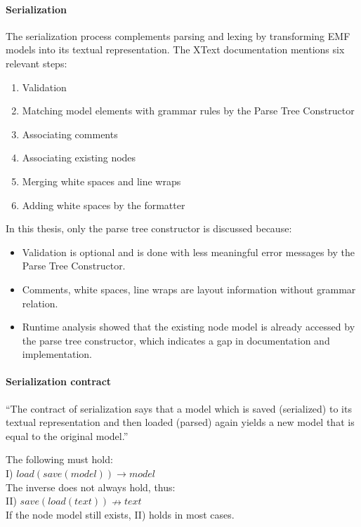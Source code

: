 \paragraph{Serialization}
The serialization process complements parsing and lexing by transforming EMF models into its textual representation. The XText documentation mentions six relevant steps:

\begin{enumerate}
	\item Validation
	\item Matching model elements with grammar rules by the Parse Tree Constructor
	\item Associating comments
	\item Associating existing nodes
	\item Merging white spaces and line wraps
	\item Adding white spaces by the formatter
\end{enumerate}

In this thesis, only the parse tree constructor is discussed because:
\begin{itemize}
	\item Validation is optional and is done with less meaningful error messages by the Parse Tree Constructor.
	\item Comments, white spaces, line wraps are layout information without grammar relation.
	\item Runtime analysis showed that the existing node model is already accessed by the parse tree constructor, which indicates a gap in documentation and implementation.
\end{itemize}

\paragraph{Serialization contract}
``The contract of serialization says that a model which is saved (serialized) to its textual representation and then loaded (parsed) again yields a new model that is equal to the original model.''\cite{XTextMan}

The following must hold:\\
I) $load(save(model)) \rightarrow model$\\
The inverse does not always hold, thus:\\
II) $save(load(text)) \nrightarrow text$\\
If the node model still exists, II) holds in most cases. 

